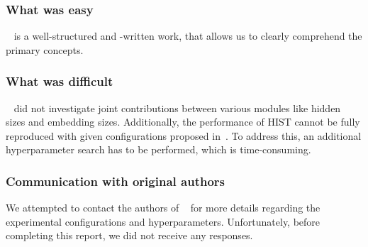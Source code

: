 \subsubsection*{What was easy}
~\cite{lim2022hypergraph} is a well-structured and -written work, that allows us to clearly comprehend the primary concepts.
\vspace{-1.8mm}
\subsubsection*{What was difficult}
~\cite{lim2022hypergraph} did not investigate joint contributions between various modules like hidden sizes and embedding sizes. Additionally, the performance of HIST cannot be fully reproduced with given configurations proposed in~\cite{lim2022hypergraph}. To address this, an additional hyperparameter search has to be performed, which is time-consuming.
\vspace{-1.8mm}
\subsubsection*{Communication with original authors}
We attempted to contact the authors of ~\cite{lim2022hypergraph} for more details regarding the experimental configurations and hyperparameters. Unfortunately, before completing this report, we did not receive any responses.

